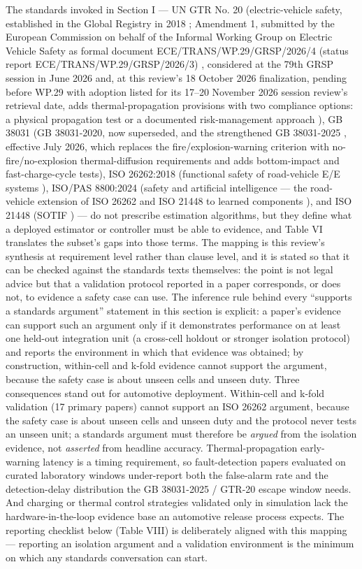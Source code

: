\documentclass[journal]{IEEEtran}
\begin{document}
The standards invoked in Section I --- UN GTR No. 20 (electric-vehicle safety, established in the Global Registry in 2018 \cite{r106}; Amendment 1, submitted by the European Commission on behalf of the Informal Working Group on Electric Vehicle Safety as formal document ECE/TRANS/WP.29/GRSP/2026/4 (status report ECE/TRANS/WP.29/GRSP/2026/3) \cite{r107}, considered at the 79th GRSP session in June 2026 and, at this review's 18 October 2026 finalization, pending before WP.29 with adoption listed for its 17--20 November 2026 session review's retrieval date, adds thermal-propagation provisions with two compliance options: a physical propagation test or a documented risk-management approach ), GB 38031 (GB 38031-2020, now superseded, and the strengthened GB 38031-2025 \cite{r108}, effective July 2026, which replaces the fire/explosion-warning criterion with no-fire/no-explosion thermal-diffusion requirements and adds bottom-impact and fast-charge-cycle tests), ISO 26262:2018 (functional safety of road-vehicle E/E systems \cite{r109}), ISO/PAS 8800:2024 (safety and artificial intelligence --- the road-vehicle extension of ISO 26262 and ISO 21448 to learned components \cite{r110}), and ISO 21448 (SOTIF \cite{r111}) --- do not prescribe estimation algorithms, but they define what a deployed estimator or controller must be able to evidence, and Table VI translates the subset's gaps into those terms. The mapping is this review's synthesis at requirement level rather than clause level, and it is stated so that it can be checked against the standards texts themselves: the point is not legal advice but that a validation protocol reported in a paper corresponds, or does not, to evidence a safety case can use. The inference rule behind every ``supports a standards argument'' statement in this section is explicit: a paper's evidence can support such an argument only if it demonstrates performance on at least one held-out integration unit (a cross-cell holdout or stronger isolation protocol) and reports the environment in which that evidence was obtained; by construction, within-cell and k-fold evidence cannot support the argument, because the safety case is about unseen cells and unseen duty. Three consequences stand out for automotive deployment. Within-cell and k-fold validation (17 primary papers) cannot support an ISO 26262 argument, because the safety case is about unseen cells and unseen duty and the protocol never tests an unseen unit; a standards argument must therefore be \textit{argued} from the isolation evidence, not \textit{asserted} from headline accuracy. Thermal-propagation early-warning latency is a timing requirement, so fault-detection papers evaluated on curated laboratory windows under-report both the false-alarm rate and the detection-delay distribution the GB 38031-2025 / GTR-20 escape window needs. And charging or thermal control strategies validated only in simulation lack the hardware-in-the-loop evidence base an automotive release process expects. The reporting checklist below (Table VIII) is deliberately aligned with this mapping --- reporting an isolation argument and a validation environment is the minimum on which any standards conversation can start.
\end{document}
